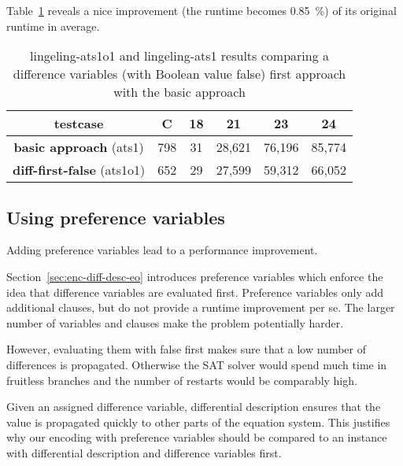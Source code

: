 Table~\ref{tab:diff-first-false-results} reveals a nice improvement (the runtime
becomes 0.85~\%) of its original runtime in average.

\begin{table}[!h]
  \begin{center}
    \begin{tabular}{c|c|cccc}
      \textbf{testcase}                   & \textbf{C} & \textbf{18} & \textbf{21} & \textbf{23} & \textbf{24} \\
    \hline
      \textbf{basic approach}      (ats1) &        798 &          31 &      28,621 &      76,196 &      85,774 \\
      \textbf{diff-first-false}  (ats1o1) &        652 &          29 &      27,599 &      59,312 &      66,052
    \end{tabular}
    \caption[Difference variables first (with Boolean value false) results]{
      lingeling-ats1o1 and lingeling-ats1 results
      comparing a difference variables (with Boolean value false) first approach
      with the basic approach
    }
    \label{tab:diff-first-false-results}
  \end{center}
\end{table}

\subsection{Using preference variables}
\label{sec:preference-variables}
%
\begin{prop}
  Adding preference variables lead to a performance improvement.
\end{prop}
%
Section~\ref{sec:enc-diff-desc-eo} introduces preference variables
which enforce the idea that difference variables are evaluated first.
Preference variables only add additional clauses, but do not provide
a runtime improvement per se. The larger number of variables and
clauses make the problem potentially harder.

However, evaluating them with false first makes sure that a low
number of differences is propagated. Otherwise the SAT solver would
spend much time in fruitless branches and the number of restarts
would be comparably high.

Given an assigned difference variable, differential description
ensures that the value is propagated quickly to other parts of
the equation system. This justifies why our encoding with preference
variables should be compared to an instance with differential
description and difference variables first.

